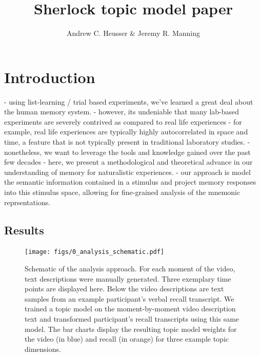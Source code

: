 \documentclass[a4paper,man,natbib,floatsintext]{apa6}
\title{Sherlock topic model paper}
\author{Andrew C. Heusser \& Jeremy R. Manning}
\affiliation{Dartmouth College}
\begin{document}
\maketitle

\section{Introduction}

- using list-learning / trial based experiments, we've learned a great deal about the human memory system.
- however, its undeniable that many lab-based experiments are severely contrived as compared to real life experiences
- for example, real life experiences are typically highly autocorrelated in space and time, a feature that is not typically present in traditional laboratory studies.
- nonetheless, we want to leverage the tools and knowledge gained over the past few decades
- here, we present a methodological and theoretical advance in our understanding of memory for naturalistic experiences.
- our approach is model the semantic information contained in a stimulus and project memory responses into this stimulus space, allowing for fine-grained analysis of the mnemonic reprsentations.

\subsection{Results}

\begin{figure}[t!]
\centering
\texttt{[image: figs/0\_analysis\_schematic.pdf]}
\caption{\label{fig:schematic}Schematic of the analysis approach. For each moment of the video, text descriptions were manually generated. Three exemplary time points are displayed here.  Below the video descriptions are text samples from an example participant's verbal recall transcript.  We trained a topic model on the moment-by-moment video description text and transformed participant's recall transcripts using this same model. The bar charts display the resulting topic model weights for the video (in blue) and recall (in orange) for three example topic dimensions.}
\end{figure}
\end{document}
